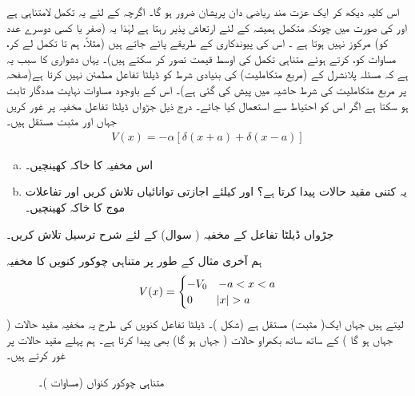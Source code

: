   اس کلیہ دیکھ کر ایک عزت مند ریاضی دان پریشان ضرور ہو گا۔ اگرچہ  کے لئے یہ تکمل لامتناہی ہے اور  کی صورت میں چونکہ متکمل ہمیشہ کے لئے ارتعاش پذیر رہتا ہے لہٰذا یہ (صفر یا کسی دوسرے عدد کو) مرکوز نہیں ہوتا ہے ۔ اس کی پیوندکاری کے طریقے پائے جاتے ہیں (مثلاً، ہم  تا  تکمل لے کر،  مساوات  کو،  کرتے ہوئے متناہی تکمل کی اوسط قیمت تصور کر سکتے ہیں)۔ یہاں دشواری کا سبب یہ ہے کہ مسئلہ پلانشرل کے (مربع متکاملیت) کی بنیادی شرط کو ڈیلٹا تفاعل مطمئن نہیں کرتا ہے(صفحہ  پر مربع متکاملیت کی شرط حاشیہ میں پیش کی گئی ہے)۔ اس کے باوجود مساوات  نہایت مددگار ثابت ہو سکتا ہے اگر اس کو احتیاط سے استعمال کیا جائے۔
درج ذیل جڑواں ڈیلٹا تفاعل مخفیہ پر غور کریں جہاں اور  مثبت مستقل ہیں۔
\begin{align*}
V(x)=-\alpha[\delta(x+a)+\delta(x-a)]
\end{align*}
\begin{enumerate}[a.]
\item
 اس مخفیہ کا خاکہ کھینچیں۔
\item
 یہ کتنی مقید حالات پیدا کرتا ہے؟  اور کیلئے اجازتی توانائیاں تلاش کریں اور تفاعلات موج کا خاکہ کھینچیں۔
\end{enumerate}
جڑواں ڈیلٹا تفاعل کے مخفیہ ( سوال) کے لئے شرح ترسیل تلاش کریں۔ 

 ہم آخری مثال کے طور پر متناہی چوکور کنویں  کا مخفیہ
\begin{align}\label{مساوات_شروڈنگر_متناہی_چکور_کنواں_مخفیہ}
V(x)=
 \begin{cases} 
  -V_{0} & -a< x< a \\
  0 & \abs{x}> a
 \end{cases}
\end{align}
لیتے ہیں جہاں ایک( مثبت) مستقل ہے (شکل  )۔ ڈیلٹا تفاعل کنویں  کی طرح یہ مخفیہ مقید حالات ( جہاں ہو گا ) کے ساتھ ساتھ بکھراو حالات ( جہاں ہو گا) بھی پیدا کرتا ہے۔ ہم پہلے مقید حالات پر غور کرتے ہیں۔
 
\begin{figure}
\centering
{}
\caption{متناہی چوکور کنواں (مساوات )۔}
\label{شکل_غیر_تابع_متناہی_کنواں}
\end{figure}
 
